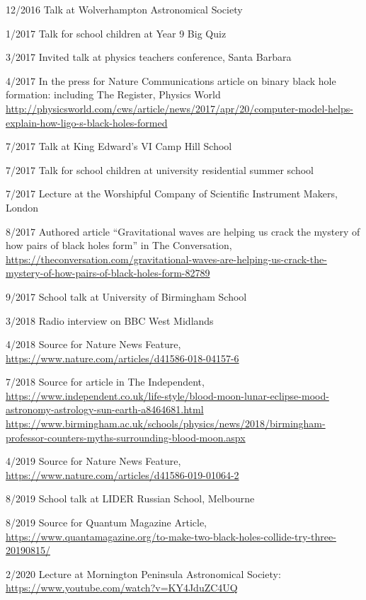 \documentclass[margin,line]{res}
\begin{document}
\begin{resume}
12/2016	Talk at Wolverhampton Astronomical Society

1/2017	Talk for school children at Year 9 Big Quiz

3/2017	Invited talk at physics teachers conference, Santa Barbara

4/2017	In the press for Nature Communications article on binary black hole formation: including The Register, %
Physics World\\ \url{http://physicsworld.com/cws/article/news/2017/apr/20/computer-model-helps-explain-how-ligo-s-black-holes-formed}

7/2017	Talk at King Edward's VI Camp Hill School

7/2017	Talk for school children at university residential summer school

7/2017 	Lecture at the Worshipful Company of Scientific Instrument Makers, London

8/2017	Authored article ``Gravitational waves are helping us crack the mystery of how pairs of black holes form'' in The Conversation,\\ 
\url{https://theconversation.com/gravitational-waves-are-helping-us-crack-the-mystery-of-how-pairs-of-black-holes-form-82789}

9/2017	School talk at University of Birmingham School

3/2018	Radio interview on BBC West Midlands

4/2018	Source for Nature News Feature, \url{https://www.nature.com/articles/d41586-018-04157-6}

7/2018 	Source for article in The Independent, \url{https://www.independent.co.uk/life-style/blood-moon-lunar-eclipse-mood-astronomy-astrology-sun-earth-a8464681.html}\\
\url{https://www.birmingham.ac.uk/schools/physics/news/2018/birmingham-professor-counters-myths-surrounding-blood-moon.aspx}

4/2019	Source for Nature News Feature, \url{https://www.nature.com/articles/d41586-019-01064-2}

8/2019	School talk at LIDER Russian School, Melbourne

8/2019 	Source for Quantum Magazine Article, \url{https://www.quantamagazine.org/to-make-two-black-holes-collide-try-three-20190815/}

2/2020	Lecture at Mornington Peninsula Astronomical Society: \url{https://www.youtube.com/watch?v=KY4JduZC4UQ}


\end{resume}
\end{document}
